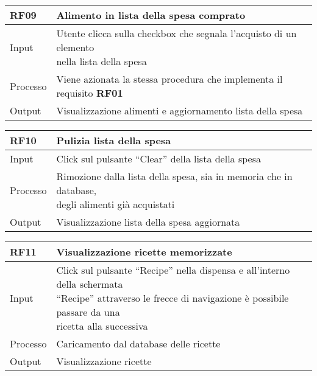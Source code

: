 \begin{table}[H]
    \begin{flushleft}
      \begin{tabular}{l|l}
        \toprule
        \textbf{RF09} & \textbf{Alimento in lista della spesa comprato}\\
        \midrule
        Input & \makecell{Utente clicca sulla checkbox che segnala l’acquisto di un elemento \\ nella lista della spesa}\\
        Processo & Viene azionata la stessa procedura che implementa il requisito \textbf{RF01}\\
        Output & Visualizzazione alimenti e aggiornamento lista della spesa\\
        \bottomrule
      \end{tabular}
    \end{flushleft}
\end{table}

\begin{table}[H]
    \begin{flushleft}
      \begin{tabular}{l|l}
        \toprule
        \textbf{RF10} & \textbf{Pulizia lista della spesa}\\
        \midrule
        Input & Click sul pulsante “Clear” della lista della spesa\\
        Processo & \makecell{Rimozione dalla lista della spesa, sia in memoria che in database, \\ degli alimenti già acquistati}\\
        Output & Visualizzazione lista della spesa aggiornata\\
        \bottomrule
      \end{tabular}
    \end{flushleft}
\end{table}

\begin{table}[H]
    \begin{flushleft}
      \begin{tabular}{l|l}
        \toprule
        \textbf{RF11} & \textbf{Visualizzazione ricette memorizzate}\\
        \midrule
        Input & \makecell{Click sul pulsante “Recipe” nella dispensa e all’interno della schermata \\ “Recipe” attraverso le frecce di navigazione è possibile passare da una \\ ricetta alla successiva}\\
        Processo & Caricamento dal database delle ricette\\
        Output & Visualizzazione ricette\\
        \bottomrule
      \end{tabular}
    \end{flushleft}
\end{table}

